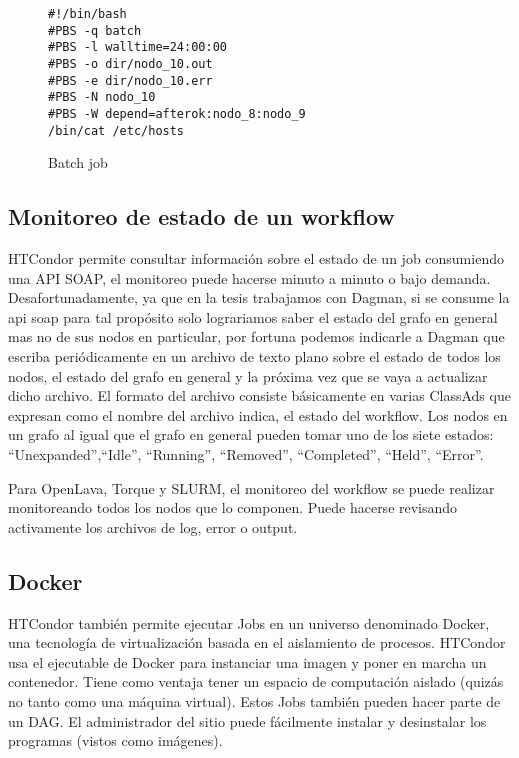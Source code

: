 \begin{figure}
\begin{lstlisting}
#!/bin/bash
#PBS -q batch
#PBS -l walltime=24:00:00
#PBS -o dir/nodo_10.out
#PBS -e dir/nodo_10.err
#PBS -N nodo_10
#PBS -W depend=afterok:nodo_8:nodo_9
/bin/cat /etc/hosts
\end{lstlisting}
\caption{Batch job}
\end{figure}

\subsection{Monitoreo de estado de un workflow}
HTCondor permite consultar información sobre el estado de un job consumiendo una API SOAP, el monitoreo puede hacerse minuto a minuto o bajo demanda. Desafortunadamente, ya que en la tesis trabajamos con Dagman, si se consume la api soap para tal propósito solo lograriamos saber el estado del grafo en general mas no de sus nodos en particular, por fortuna podemos indicarle a Dagman que escriba periódicamente en un archivo de texto plano sobre el estado de todos los nodos, el estado del grafo en general y la próxima vez que se vaya a actualizar dicho archivo. El formato del archivo consiste básicamente en varias ClassAds que expresan como el nombre del archivo indica, el estado del workflow. Los nodos en un grafo al igual que el grafo en general pueden tomar uno de los siete estados: “Unexpanded”,“Idle”, “Running”, “Removed”, “Completed”, “Held”, “Error”.

Para OpenLava, Torque y SLURM, el monitoreo del workflow se puede realizar monitoreando todos los nodos que lo componen. Puede hacerse revisando activamente los archivos de log, error o output.

\subsection{Docker}
HTCondor también permite ejecutar Jobs en un universo denominado Docker, una tecnología de virtualización basada en el aislamiento de procesos. HTCondor usa el ejecutable de Docker para instanciar una imagen y poner en marcha un contenedor. Tiene como ventaja tener un espacio de computación aislado (quizás no tanto como una máquina virtual). Estos Jobs también pueden hacer parte de un DAG. El administrador del sitio puede fácilmente instalar y desinstalar los programas (vistos como imágenes). \\

